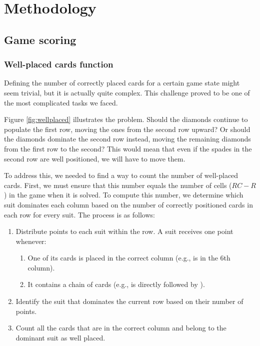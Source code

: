 \chapter{Methodology}
\section{Game scoring}
\subsection{Well-placed cards function} \label{ssec:wellplaced}
Defining the number of correctly placed cards for a certain game state might seem trivial, but it is actually quite complex. This challenge proved to be one of the most complicated tasks we faced.

Figure \ref{fig:wellplaced} illustrates the problem. Should the diamonds continue to populate the first row, moving the ones from the second row upward? Or should the diamonds dominate the second row instead, moving the remaining diamonds from the first row to the second? This would mean that even if the spades in the second row are well positioned, we will have to move them.

To address this, we needed to find a way to count the number of well-placed cards. First, we must ensure that this number equals the number of cells ($RC - R$) in the game when it is solved. To compute this number, we determine which suit dominates each column based on the number of correctly positioned cards in each row for every suit. The process is as follows:

\begin{enumerate}
    \item Distribute points to each suit within the row. A suit receives one point whenever:
    \begin{enumerate}
        \item One of its cards is placed in the correct column (e.g.,  is in the 6th column).
        \item It contains a chain of cards (e.g.,  is directly followed by ).
    \end{enumerate}
    \item Identify the suit that dominates the current row based on their number of points.
    \item Count all the cards that are in the correct column and belong to the dominant suit as well placed.
\end{enumerate}

